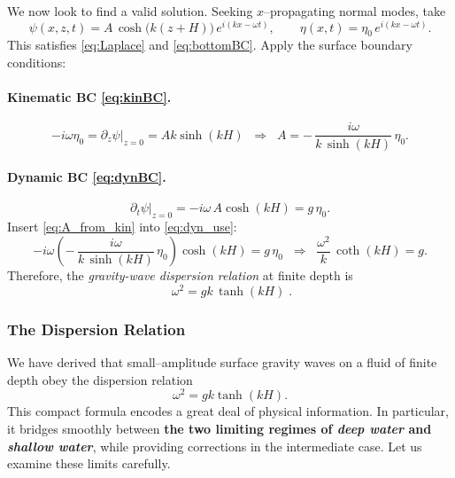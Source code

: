 We now look to find a valid solution. Seeking $x$–propagating normal modes, take
\begin{equation}
\psi(x,z,t) = A\,\cosh\!\bigl(k(z+H)\bigr)\,e^{i(kx-\omega t)},
\qquad
\eta(x,t)=\eta_0\,e^{i(kx-\omega t)}.
\label{eq:ansatz}
\end{equation}
This satisfies \eqref{eq:Laplace} and \eqref{eq:bottomBC}.  Apply the surface boundary conditions:

\paragraph{Kinematic BC \eqref{eq:kinBC}.}
\begin{equation}
-i\omega \eta_0 = \partial_z \psi|_{z=0}
= A k \sinh(kH)
\;\;\Rightarrow\;\;
A = -\,\frac{i\omega}{k\,\sinh(kH)}\,\eta_0.
\label{eq:A_from_kin}
\end{equation}

\paragraph{Dynamic BC \eqref{eq:dynBC}.}
\begin{equation}
\partial_t \psi|_{z=0} = -i\omega\,A\cosh(kH) = g\,\eta_0.
\label{eq:dyn_use}
\end{equation}
Insert \eqref{eq:A_from_kin} into \eqref{eq:dyn_use}:
\begin{equation}
-i\omega \left(-\,\frac{i\omega}{k\,\sinh(kH)}\,\eta_0\right)\cosh(kH)=g\,\eta_0
\;\;\Rightarrow\;\;
\frac{\omega^2}{k}\,\coth(kH)=g.
\end{equation}
Therefore, the \emph{gravity-wave dispersion relation} at finite depth is
\begin{equation}
\boxed{\;\omega^2 = g k\,\tanh(kH)\;.}
\end{equation}
\subsubsection{The Dispersion Relation}

We have derived that small–amplitude surface gravity waves on a fluid of finite depth obey the dispersion relation
\[
\omega^2 = g k \tanh(kH).
\]
This compact formula encodes a great deal of physical information. In particular, it bridges smoothly between \textbf{the two limiting regimes of \emph{deep water} and \emph{shallow water}}, while providing corrections in the intermediate case. Let us examine these limits carefully.

